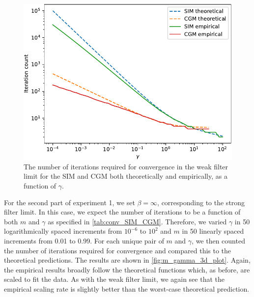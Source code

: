 \begin{figure}[t]
    \begin{center} 
    \includegraphics[width=0.7\linewidth]{Figures/gamma_plot_2d.pdf}
    \end{center}
    \caption{\small{The number of iterations required for convergence in the weak filter limit for the SIM and CGM both theoretically and empirically, as a function of $\gamma$.}}
    \label{fig:gamma_2d_plot}
\end{figure}


For the second part of experiment 1, we set $\beta = \infty$, corresponding to the strong filter limit. In this case, we expect the number of iterations to be a function of both $m$ and $\gamma$ as specified in \cref{tab:conv_SIM_CGM}. Therefore, we varied $\gamma$ in 50 logarithmically spaced increments from $10^{-6}$ to $10^2$ and $m$ in 50 linearly spaced increments from 0.01 to 0.99. For each unique pair of $m$ and $\gamma$, we then counted the number of iterations required for convergence and compared this to the theoretical predictions. The results are shown in \cref{fig:m_gamma_3d_plot}. Again, the empirical results broadly follow the theoretical functions which, as before, are scaled to fit the data. As with the weak filter limit, we again see that the empirical scaling rate is slightly better than the worst-case theoretical prediction. 

